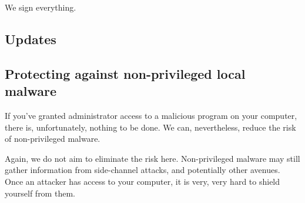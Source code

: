 We sign everything.


\subsection{Updates}


\subsection{Protecting against non-privileged local malware}

If you've granted administrator access to a malicious program on your computer, there is, unfortunately, nothing to be done. We can, nevertheless, reduce the risk of non-privileged malware. 


Again, we do not aim to eliminate the risk here. Non-privileged malware may still gather information from side-channel attacks, and potentially other avenues. Once an attacker has access to your computer, it is very, very hard to shield yourself from them.
